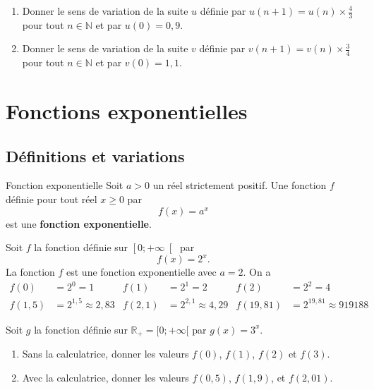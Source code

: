 \documentclass[11pt]{article}
\begin{document}
\begin{app}
  \begin{enumerate}
    \item Donner le sens de variation de la suite $u$ définie par $u(n+1)=u(n)\times
  \frac{4}{3}$ pour tout $n\in\mathbb{N}$ et par $u(0)=0,9$.
    \item Donner le sens de variation de la suite $v$ définie par $v(n+1)=v(n)\times
  \frac{3}{4}$ pour tout $n\in\mathbb{N}$ et par $v(0)=1,1$.
  \end{enumerate}
\end{app}

\section{Fonctions exponentielles}
\subsection{Définitions et variations}
\begin{defi}{Fonction exponentielle}
  Soit $a>0$ un réel strictement positif. Une fonction $f$ définie pour tout
  réel $x\geq0$ par
  \[
    f(x)=a^x
  \]
  est une \textbf{fonction exponentielle}.
\end{defi}
\begin{exemple}
  Soit $f$ la fonction définie sur $\left[ 0;+\infty \right[$ par 
  \[
    f(x)=2^x.
  \]
  La fonction $f$ est une fonction exponentielle avec $a=2$. On a
  \begin{align*}
    f(0) &= 2^0 = 1 &
    f(1) &= 2^1 = 2 &
    f(2) &= 2^2 = 4 \\
    f(1,5) &= 2^{1,5} \approx 2,83 &
    f(2,1) &= 2^{2,1} \approx 4,29 &
    f(19,81) &= 2^{19,81} \approx 919188
  \end{align*}
\end{exemple}
\begin{app}
  Soit $g$ la fonction définie sur $\mathbb{R}_+=[0;+\infty[$ par $g(x)=3^x$.
    \begin{enumerate}
      \item Sans la calculatrice, donner les valeurs $f(0)$, $f(1)$, $f(2)$ et
        $f(3)$.
      \item Avec la calculatrice, donner les valeurs $f(0,5)$, $f(1,9)$, et
        $f(2,01)$.
    \end{enumerate}
\end{app}
\end{document}
